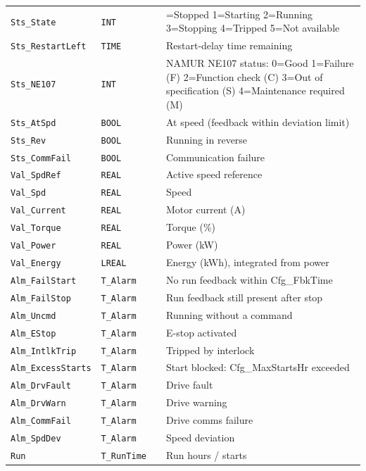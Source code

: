 {\begin{longtable}{@{}>{\raggedright\arraybackslash}p{3.4cm}>{\raggedright\arraybackslash}p{3.3cm}>{\raggedright\arraybackslash}p{1.3cm}>{\raggedright\arraybackslash}p{6.4cm}@{}}
\texttt{Sts\_State} & \texttt{INT} &  & 0=Stopped 1=Starting 2=Running 3=Stopping 4=Tripped 5=Not available \\
\texttt{Sts\_RestartLeft} & \texttt{TIME} &  & Restart-delay time remaining \\
\texttt{Sts\_NE107} & \texttt{INT} &  & NAMUR NE107 status: 0=Good 1=Failure (F) 2=Function check (C) 3=Out of specification (S) 4=Maintenance required (M) \\
\texttt{Sts\_AtSpd} & \texttt{BOOL} &  & At speed (feedback within deviation limit) \\
\texttt{Sts\_Rev} & \texttt{BOOL} &  & Running in reverse \\
\texttt{Sts\_CommFail} & \texttt{BOOL} &  & Communication failure \\
\texttt{Val\_SpdRef} & \texttt{REAL} &  & Active speed reference \\
\texttt{Val\_Spd} & \texttt{REAL} &  & Speed \\
\texttt{Val\_Current} & \texttt{REAL} &  & Motor current (A) \\
\texttt{Val\_Torque} & \texttt{REAL} &  & Torque (\%) \\
\texttt{Val\_Power} & \texttt{REAL} &  & Power (kW) \\
\texttt{Val\_Energy} & \texttt{LREAL} &  & Energy (kWh), integrated from power \\
\texttt{Alm\_FailStart} & \texttt{T\_Alarm} &  & No run feedback within Cfg\_FbkTime \\
\texttt{Alm\_FailStop} & \texttt{T\_Alarm} &  & Run feedback still present after stop \\
\texttt{Alm\_Uncmd} & \texttt{T\_Alarm} &  & Running without a command \\
\texttt{Alm\_EStop} & \texttt{T\_Alarm} &  & E-stop activated \\
\texttt{Alm\_IntlkTrip} & \texttt{T\_Alarm} &  & Tripped by interlock \\
\texttt{Alm\_ExcessStarts} & \texttt{T\_Alarm} &  & Start blocked: Cfg\_MaxStartsHr exceeded \\
\texttt{Alm\_DrvFault} & \texttt{T\_Alarm} &  & Drive fault \\
\texttt{Alm\_DrvWarn} & \texttt{T\_Alarm} &  & Drive warning \\
\texttt{Alm\_CommFail} & \texttt{T\_Alarm} &  & Drive comms failure \\
\texttt{Alm\_SpdDev} & \texttt{T\_Alarm} &  & Speed deviation \\
\texttt{Run} & \texttt{T\_RunTime} &  & Run hours /\allowbreak{} starts \\
\bottomrule
\end{longtable}
}
